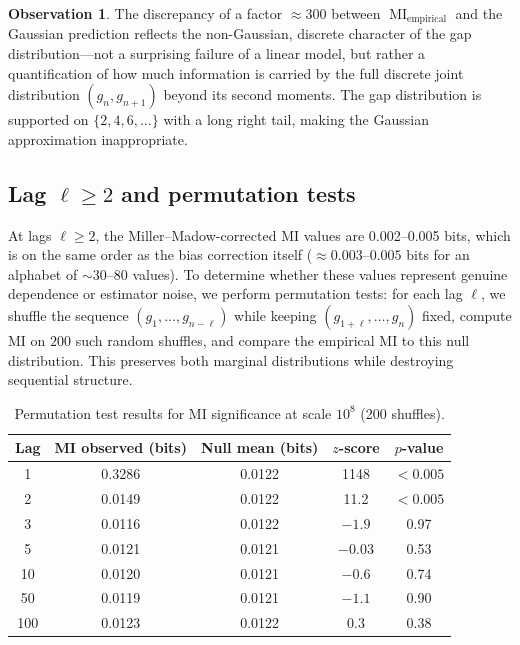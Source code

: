 \documentclass[11pt, a4paper]{amsart}
\theoremstyle{plain}
\theoremstyle{definition}
\newtheorem{observation}[theorem]{Observation}
\newcommand{\MI}{\operatorname{MI}}
\begin{document}
\begin{observation}
\label{obs:nonlinear}
The discrepancy of a factor $\approx 300$ between $\MI_{\text{empirical}}$ and the Gaussian prediction reflects the non-Gaussian, discrete character of the gap distribution---not a surprising failure of a linear model, but rather a quantification of how much information is carried by the full discrete joint distribution $(g_n, g_{n+1})$ beyond its second moments. The gap distribution is supported on $\{2, 4, 6, \ldots\}$ with a long right tail, making the Gaussian approximation inappropriate.
\end{observation}

\subsection{Lag $\ell \ge 2$ and permutation tests}

At lags $\ell \ge 2$, the Miller--Madow-corrected MI values are 0.002--0.005 bits, which is on the same order as the bias correction itself ($\approx 0.003$--$0.005$ bits for an alphabet of $\sim 30$--$80$ values). To determine whether these values represent genuine dependence or estimator noise, we perform permutation tests: for each lag $\ell$, we shuffle the sequence $(g_1, \ldots, g_{n-\ell})$ while keeping $(g_{1+\ell}, \ldots, g_n)$ fixed, compute MI on $200$ such random shuffles, and compare the empirical MI to this null distribution. This preserves both marginal distributions while destroying sequential structure.

\begin{table}[ht]
\centering
\caption{Permutation test results for MI significance at scale $10^8$ (200 shuffles).}
\label{tab:perm}
\begin{tabular}{ccccc}
\toprule
Lag & MI observed (bits) & Null mean (bits) & $z$-score & $p$-value \\
\midrule
1 & 0.3286 & 0.0122 & 1148 & $< 0.005$ \\
2 & 0.0149 & 0.0122 & 11.2 & $< 0.005$ \\
3 & 0.0116 & 0.0122 & $-1.9$ & 0.97 \\
5 & 0.0121 & 0.0121 & $-0.03$ & 0.53 \\
10 & 0.0120 & 0.0121 & $-0.6$ & 0.74 \\
50 & 0.0119 & 0.0121 & $-1.1$ & 0.90 \\
100 & 0.0123 & 0.0122 & $0.3$ & 0.38 \\
\bottomrule
\end{tabular}
\end{table}
\end{document}

